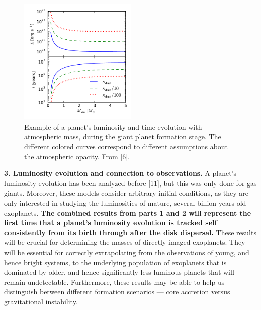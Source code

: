 \documentclass[12pt, letterpaper]{article}
\begin{document}
\begin{figure}[h]
\centering
\includegraphics[width=0.5\textwidth]{opacity_effect.pdf}
\caption{Example of a planet's luminosity and time evolution with atmospheric mass, during the giant planet formation stage. The different colored curves correspond to different assumptions about the atmospheric opacity. From [6].}  %
\label{fig:LtvsMopacity}
\end{figure}

\vspace{0.2in}

\textbf{3. Luminosity evolution and connection to observations.} A planet's luminosity evolution has been analyzed before [11], but this was only done for gas giants. Moreover, these models consider arbitrary initial conditions, as they are only interested in studying the luminosities of mature, several billion years old exoplanets. \textbf{The combined results from parts 1 and 2 will represent the first time that a planet's luminosity evolution is tracked self consistently from its birth through after the disk dispersal.} These results will be crucial for determining the masses of directly imaged exoplanets. They will be essential for correctly extrapolating from the observations of young, and hence bright systems, to the underlying population of exoplanets that is dominated by older, and hence significantly less luminous planets that will remain undetectable. Furthermore, these results may be able to help us distinguish between different formation scenarios --- core accretion versus gravitational instability. 
\end{document}
